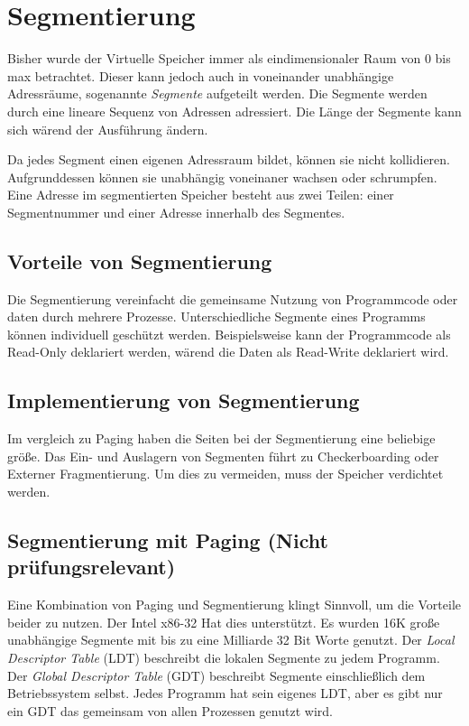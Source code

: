 \section{Segmentierung}

Bisher wurde der Virtuelle Speicher immer als eindimensionaler Raum von 0 bis
max betrachtet. Dieser kann jedoch auch in voneinander unabhängige Adressräume,
sogenannte \textit{Segmente} aufgeteilt werden. Die Segmente werden durch eine
lineare Sequenz von Adressen adressiert. Die Länge der Segmente kann sich
wärend der Ausführung ändern.

Da jedes Segment einen eigenen Adressraum bildet, können sie nicht
ko\-lli\-die\-ren. Aufgrunddessen können sie unabhängig voneinaner wachsen oder
schrumpfen. Eine Adresse im segmentierten Speicher besteht aus zwei Teilen:
einer Seg\-ment\-nummer und einer Adresse innerhalb des Segmentes.

\subsection{Vorteile von Segmentierung}

Die Segmentierung vereinfacht die gemeinsame Nutzung von Programmcode oder
daten durch mehrere Prozesse. Unterschiedliche Segmente eines Pro\-gramms
können individuell geschützt werden. Beispielsweise kann der Pro\-gramm\-code
als Read-Only deklariert werden, wärend die Daten als Read-Write deklariert
wird.

\subsection{Implementierung von Segmentierung}

Im vergleich zu Paging haben die Seiten bei der Segmentierung eine beliebige
größe. Das Ein- und Auslagern von Segmenten führt zu Checkerboarding oder
Externer Fragmentierung. Um dies zu vermeiden, muss der Speicher verdichtet
werden.

\subsection{Segmentierung mit Paging (Nicht prüfungsrelevant)}

Eine Kombination von Paging und Segmentierung klingt Sinnvoll, um die Vorteile
beider zu nutzen. Der Intel x86-32 Hat dies unterstützt. Es wurden 16K große
unabhängige Segmente mit bis zu eine Milliarde 32 Bit Worte genutzt. Der
\textit{Local Descriptor Table} (LDT) beschreibt die lokalen Segmente zu jedem
Programm. Der \textit{Global Descriptor Table} (GDT) beschreibt Segmente
einschließlich dem Betriebssystem selbst. Jedes Programm hat sein eigenes LDT,
aber es gibt nur ein GDT das gemeinsam von allen Prozessen genutzt wird.

